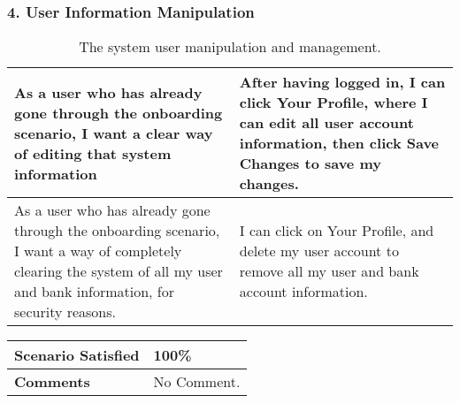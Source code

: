 \subsubsection{4. User Information Manipulation}
\begin{longtable}{|m{7cm}|l|} 
\caption[]{The system user manipulation and management.} 
\\\hline 
\multicolumn{1}{|p{7cm}|}{As a user who has already gone through the onboarding scenario, I want a clear way of editing that system information} & \multicolumn{1}{p{7cm}|}{After having logged in, I can click Your Profile, where I can edit all user account information, then click Save Changes to save my changes.}\\ \hline
\multicolumn{1}{|p{7cm}|}{As a user who has already gone through the onboarding scenario, I want a way of completely clearing the system of all my user and bank information, for security reasons.} & \multicolumn{1}{p{7cm}|}{I can click on Your Profile, and delete my user account to remove all my user and bank account information.}\\ \hline
\end{longtable}

\begin{longtable}{|m{4cm}|l|}\hline 
\cellcolor[HTML]{C0C0C0}\textbf{Scenario Satisfied} & \multicolumn{1}{p{13cm}|}{100\%}\\ \hline
\cellcolor[HTML]{C0C0C0}\textbf{Comments} & \multicolumn{1}{p{13cm}|}{No Comment.}\\ \hline
\end{longtable}


